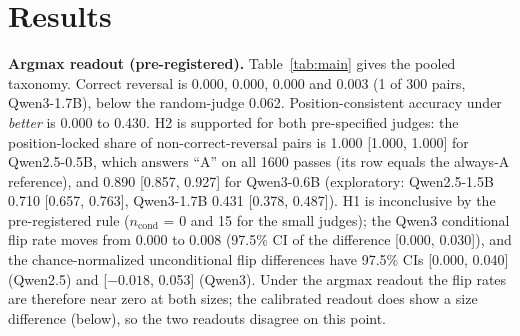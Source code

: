 \documentclass[conference]{IEEEtran}
\begin{document}
\section{Results}\label{sec:results}
\textbf{Argmax readout (pre-registered).} Table~\ref{tab:main} gives the pooled taxonomy. Correct reversal is
0.000, 0.000, 0.000 and 0.003 (1 of 300 pairs, Qwen3-1.7B), below the random-judge 0.062. Position-consistent
accuracy under \emph{better} is 0.000 to 0.430. H2 is supported for both pre-specified judges: the
position-locked share of non-correct-reversal pairs is 1.000 [1.000, 1.000] for Qwen2.5-0.5B, which answers
``A'' on all 1600 passes (its row equals the always-A reference), and 0.890 [0.857, 0.927] for Qwen3-0.6B
(exploratory: Qwen2.5-1.5B 0.710 [0.657, 0.763], Qwen3-1.7B 0.431 [0.378, 0.487]). H1 is inconclusive by the
pre-registered rule ($n_\mathrm{cond}$ = 0 and 15 for the small judges); the Qwen3 conditional flip rate moves
from 0.000 to 0.008 (97.5\% CI of the difference [0.000, 0.030]), and the chance-normalized unconditional flip
differences have 97.5\% CIs [0.000, 0.040] (Qwen2.5) and [$-0.018$, 0.053] (Qwen3). Under the argmax readout
the flip rates are therefore near zero at both sizes; the calibrated readout does show a size difference
(below), so the two readouts disagree on this point.

\begin{table}[t]
\centering
\caption{Argmax readout, pooled over 300 RewardBench pairs per judge (W1 = ``Which response is worse?''). Shares
over all 300 pairs. $n_\mathrm{cond}$: pairs correct under ``better'' in both orders. Reference rows are
analytic. ``undef.'': $n_\mathrm{cond}=0$. Position-locked shares are largely predicted by letter rates
(Table~\ref{tab:cal}); see text.}
\label{tab:main}
\end{table}
\end{document}
